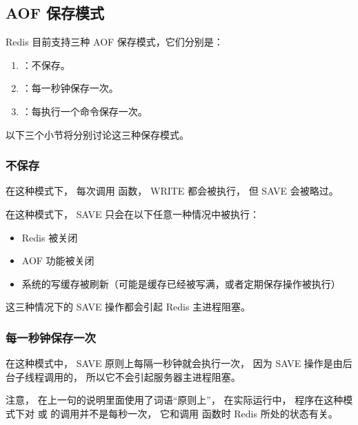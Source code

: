 \documentclass[a4paper,11pt,english]{sphinxmanual}
\begin{document}
\subsection{AOF 保存模式}
\label{internal/aof:id5}
Redis 目前支持三种 AOF 保存模式，它们分别是：
\begin{enumerate}
\item {} 
 ：不保存。

\item {} 
 ：每一秒钟保存一次。

\item {} 
 ：每执行一个命令保存一次。

\end{enumerate}

以下三个小节将分别讨论这三种保存模式。


\subsubsection{不保存}
\label{internal/aof:id6}
在这种模式下，
每次调用  函数，
WRITE 都会被执行，
但 SAVE 会被略过。

在这种模式下， SAVE 只会在以下任意一种情况中被执行：
\begin{itemize}
\item {} 
Redis 被关闭

\item {} 
AOF 功能被关闭

\item {} 
系统的写缓存被刷新（可能是缓存已经被写满，或者定期保存操作被执行）

\end{itemize}

这三种情况下的 SAVE 操作都会引起 Redis 主进程阻塞。


\subsubsection{每一秒钟保存一次}
\label{internal/aof:id7}
在这种模式中，
SAVE 原则上每隔一秒钟就会执行一次，
因为 SAVE 操作是由后台子线程调用的，
所以它不会引起服务器主进程阻塞。

注意，
在上一句的说明里面使用了词语“原则上”，
在实际运行中，
程序在这种模式下对  或  的调用并不是每秒一次，
它和调用  函数时 Redis 所处的状态有关。
\end{document}
